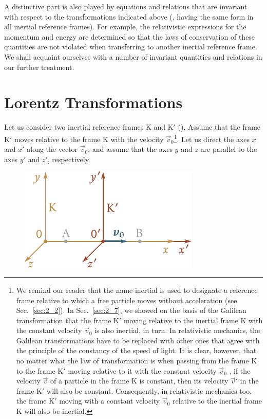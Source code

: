 A distinctive part is also played by equations and relations that are invariant with respect to the transformations indicated above (\ie, having the same form in all inertial reference frames). For example, the relativistic expressions for the momentum and energy are determined so that the laws of conservation of these quantities are not violated when transferring to another inertial reference frame. We shall acquaint ourselves with a number of invariant quantities and relations in our further treatment.

\section{Lorentz Transformations}\label{sec:8_2}

Let us consider two inertial reference frames K and K$'$ (). Assume that the frame K$'$ moves relative to the frame K with the velocity $\vec{v}_0$\footnote{We remind our reader that the name inertial is used to designate a reference frame relative to which a free particle moves without acceleration (see Sec.~\ref{sec:2_2}). In Sec.~\ref{sec:2_7}, we showed on the basis of the Galilean transformation that the frame K$'$ moving relative to the inertial frame K with the constant velocity	$\vec{v}_0$ is also inertial, in turn. In relativistic mechanics, the Galilean transformations have to be replaced with other ones that agree with the principle of the constancy of the speed of light. It is clear, however, that no matter what the law of transformation is when passing from the frame K to the frame K$'$ moving relative to it with the constant velocity $\vec{v}_0$ , if the velocity $\vec{v}$ of a particle in the frame K is constant, then its velocity $\vec{v}'$ in the frame K$'$ will also be constant. Consequently, in relativistic mechanics too, the frame K$'$ moving with a constant velocity $\vec{v}_0$ relative to the inertial frame K will also be inertial.}. Let us direct the axes $x$ and $x'$ along the vector $\vec{v}_0$, and assume that the axes $y$ and $z$ are parallel to the axes $y'$ and $z'$, respectively.

\begin{figure}[t]
	\begin{center}
		\includegraphics[scale=0.95]{figures/ch_08/fig_8_2.pdf}
		\caption[]{}
		\label{fig:8_2}
	\end{center}
	\vspace{-0.8cm}
\end{figure}

